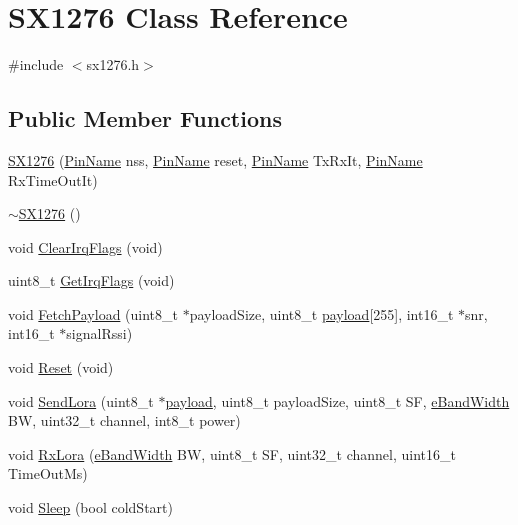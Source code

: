 \hypertarget{class_s_x1276}{}\section{S\+X1276 Class Reference}
\label{class_s_x1276}


{\ttfamily \#include $<$sx1276.\+h$>$}

\subsection*{Public Member Functions}
\begin{DoxyCompactItemize}
\item 
\mbox{\hyperlink{class_s_x1276_a9fd5df20eb50285357e5c5f1dbcbbd4c}{S\+X1276}} (\mbox{\hyperlink{_class_s_t_m32_l0_8h_a5ceb873075d76667eb54dc6a7d2734d1}{Pin\+Name}} nss, \mbox{\hyperlink{_class_s_t_m32_l0_8h_a5ceb873075d76667eb54dc6a7d2734d1}{Pin\+Name}} reset, \mbox{\hyperlink{_class_s_t_m32_l0_8h_a5ceb873075d76667eb54dc6a7d2734d1}{Pin\+Name}} Tx\+Rx\+It, \mbox{\hyperlink{_class_s_t_m32_l0_8h_a5ceb873075d76667eb54dc6a7d2734d1}{Pin\+Name}} Rx\+Time\+Out\+It)
\item 
\mbox{\hyperlink{class_s_x1276_a309d7607da2a200cf0a288532540b133}{$\sim$\+S\+X1276}} ()
\item 
void \mbox{\hyperlink{class_s_x1276_a7afd0cc488888310b8821eaa8000f1bb}{Clear\+Irq\+Flags}} (void)
\item 
uint8\+\_\+t \mbox{\hyperlink{class_s_x1276_a993418a10ee158597c183324c6328f02}{Get\+Irq\+Flags}} (void)
\item 
void \mbox{\hyperlink{class_s_x1276_ade5b7c1ac84e1f18e4d2487f12763cfa}{Fetch\+Payload}} (uint8\+\_\+t $\ast$payload\+Size, uint8\+\_\+t \mbox{\hyperlink{structpayload}{payload}}\mbox{[}255\mbox{]}, int16\+\_\+t $\ast$snr, int16\+\_\+t $\ast$signal\+Rssi)
\item 
void \mbox{\hyperlink{class_s_x1276_a279a0411958926be3b67e42bd5d0bf5c}{Reset}} (void)
\item 
void \mbox{\hyperlink{class_s_x1276_a3c109223d212fb13d5eed45de23ccee6}{Send\+Lora}} (uint8\+\_\+t $\ast$\mbox{\hyperlink{structpayload}{payload}}, uint8\+\_\+t payload\+Size, uint8\+\_\+t SF, \mbox{\hyperlink{_define_8h_a6cbb491180e131f374cdbe63880c85e1}{e\+Band\+Width}} BW, uint32\+\_\+t channel, int8\+\_\+t power)
\item 
void \mbox{\hyperlink{class_s_x1276_a53de2b0fe1c40753e82279518ccd1992}{Rx\+Lora}} (\mbox{\hyperlink{_define_8h_a6cbb491180e131f374cdbe63880c85e1}{e\+Band\+Width}} BW, uint8\+\_\+t SF, uint32\+\_\+t channel, uint16\+\_\+t Time\+Out\+Ms)
\item 
void \mbox{\hyperlink{class_s_x1276_a479a2ca97b17fd54224ad2fac9d84193}{Sleep}} (bool cold\+Start)
\end{DoxyCompactItemize}
